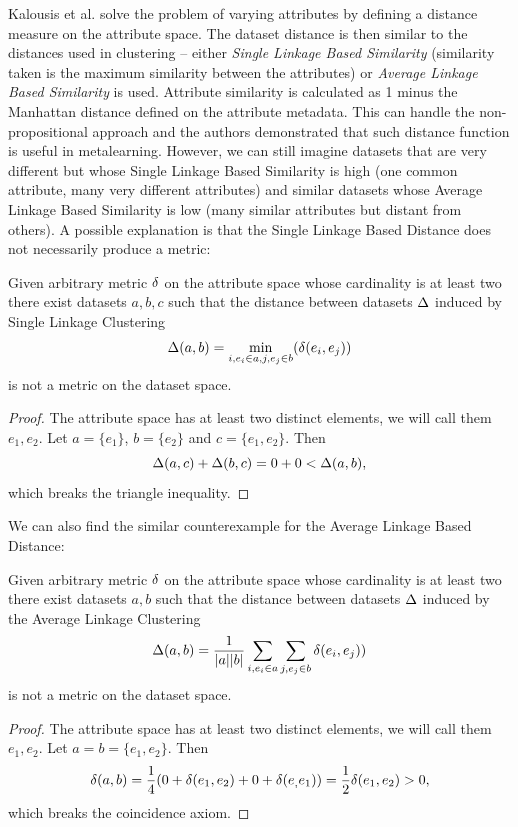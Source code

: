 Kalousis et al. \cite{RepresentationalIssuesInMetalearning} solve the problem of varying attributes by defining a distance measure on the attribute space. The dataset distance is then similar to the distances used in clustering -- either \emph{Single Linkage Based Similarity} (similarity taken is the maximum similarity between the attributes) or \emph{Average Linkage Based Similarity} is used. Attribute similarity is calculated as 1 minus the Manhattan distance defined on the attribute metadata. This can handle the non-propositional approach and the authors demonstrated that such distance function is useful in metalearning. However, we can still imagine datasets that are very different but whose Single Linkage Based Similarity is high (one common attribute, many very different attributes) and similar datasets whose Average Linkage Based Similarity is low (many similar attributes but distant from others).
A possible explanation is that the Single Linkage Based Distance  does not necessarily produce a metric:
\begin{observation}
	Given arbitrary metric $\delta$ on the attribute space whose cardinality is at least two there exist datasets $a,b,c$ such that the distance between datasets $\Delta$ induced by Single Linkage Clustering 
	$$\Delta(a,b)=\min_{i, e_i \in a, j, e_j \in b}(\delta(e_i,e_j))$$ is not a metric on the dataset space.
	\begin{proof}
	The attribute space has at least two distinct elements, we will call them $e_1, e_2$. Let $a=\{e_1\}$, $b=\{e_2\}$ and $c=\{e_1, e_2\}$. Then $$\Delta(a,c)+\Delta(b,c) = 0+0 < \Delta(a,b),$$
	which breaks the triangle inequality.
	\end{proof}	
\end{observation}

We can also find the similar counterexample for the Average Linkage Based Distance:
\begin{observation}
	Given arbitrary metric $\delta$ on the attribute space whose cardinality is at least two there exist datasets $a,b$ such that the distance between datasets $\Delta$ induced by the Average Linkage Clustering $$\Delta(a,b)=\frac{1}{|a||b|}\sum_{i, e_i \in a}\sum_{j, e_j \in b}\delta(e_i,e_j))$$ is not a metric on the dataset space.
	\begin{proof}
		The attribute space has at least two distinct elements, we will call them $e_1, e_2$. Let $a=b=\{e_1, e_2\}$. Then $$\delta(a,b)=\frac{1}{4}(0+\delta(e_1, e_2)+0+\delta(e_,e_1))=\frac{1}{2}\delta(e_1,e_2)>0,$$
		which breaks the coincidence axiom.
	\end{proof}	
\end{observation}

